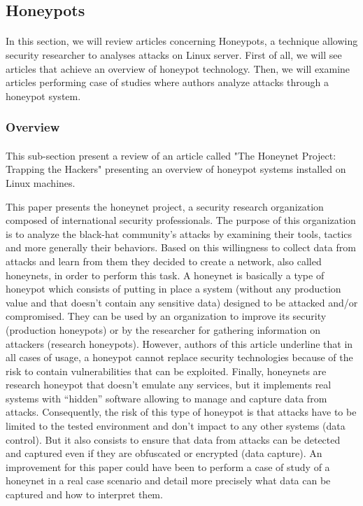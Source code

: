 \subsection{Honeypots} %

\paragraph{}

In this section, we will review articles concerning Honeypots, a technique allowing security
researcher to analyses attacks on Linux server. First of all, we will see articles that
achieve an overview of honeypot technology. Then, we will examine articles performing case
of studies where authors analyze attacks through a honeypot system.

\subsubsection{Overview} %

\paragraph{}

This sub-section present a review of an article called "The Honeynet Project: Trapping
the Hackers" \cite{paperHoneynetProj} presenting an overview of honeypot systems installed on Linux machines.

This paper presents the honeynet project, a security research organization composed of
international security professionals. The purpose of this organization is to analyze the
black-hat community’s attacks by examining their tools, tactics and more generally their
behaviors. Based on this willingness to collect data from attacks and learn from them they
decided to create a network, also called honeynets, in order to perform this task.
A honeynet is basically a type of honeypot which consists of putting in place a system
(without any production value and that doesn’t contain any sensitive data) designed to be
attacked and/or compromised. They can be used by an organization to improve its security 
(production honeypots) or by the researcher for gathering information on attackers 
(research honeypots). However, authors of this article underline that in all cases of usage,
a honeypot cannot replace security technologies because of the risk to contain vulnerabilities
that can be exploited. Finally, honeynets are research honeypot that doesn't emulate any
services, but it implements real systems with “hidden” software allowing to manage and
capture data from attacks. Consequently, the risk of this type of honeypot is that attacks
have to be limited to the tested environment and don’t impact to any other systems
(data control). But it also consists to ensure that data from attacks can be detected and
captured even if they are obfuscated or encrypted (data capture). An improvement for this
paper could have been to perform a case of study of a honeynet in a real case scenario and
detail more precisely what data can be captured and how to interpret them.

